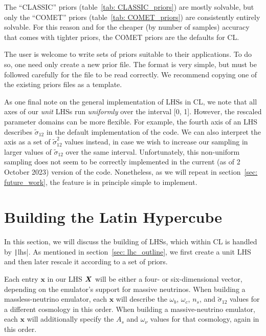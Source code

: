 The ``CLASSIC'' priors (table~\ref{tab: CLASSIC_priors}) are mostly solvable, 
but only the ``COMET'' priors (table~\ref{tab: COMET_priors}) are consistently
entirely solvable. For this reason and for the cheaper (by number of samples) 
accuracy that comes with tighter priors, the COMET priors are the defaults for 
CL.

The user is welcome to write sets of priors suitable to their applications.
To do so, one need only create a new prior file. The format is very simple, 
but must be followed carefully for the file to be read correctly. We
recommend copying one of the existing priors files as a template. 

As one final note on the general implementation of LHSs in CL, we note that
all axes of our \textit{unit} LHSs run \textit{uniformly} over the interval
[0, 1]. However, the rescaled 
parameter domains can be more flexible. For example, the fourth axis
of an LHS
describes $\tilde{\sigma}_{12}$ in the default implementation of the code. We can also
interpret the axis as a set of $\tilde{\sigma}_{12}^2$ values instead,
in case we wish to
increase our sampling in larger values of $\tilde{\sigma}_{12}$ over the same
interval. Unfortunately, this non-uniform sampling does not seem to be
correctly implemented
in the current (as of 2 October 2023) version of the code. Nonetheless, as we
will repeat in section~\ref{sec: future_work},
the feature is in principle simple to implement.


\section{Building the Latin Hypercube}
\label{sec: build_lhc}


In this section, we will discuss the building of LHSs, which within CL is 
handled by \texttt|lhs|. As mentioned in section~\ref{sec: lhc_outline},
we first create a unit LHS and then later rescale it according to a set of
priors.

Each entry $\bm{x}$ in our LHS $\bm{X}$ will be either a four- or
six-dimensional vector, 
depending on the emulator's support for massive neutrinos. When building a
massless-neutrino emulator, each $\bm{x}$ will describe the $\omega_b$,
$\omega_c$, $n_s$, and
$\tilde{\sigma}_{12}$ values for a different cosmology in 
this order. When building a massive-neutrino emulator, each $\bm{x}$ will 
additionally specify the $A_s$ and $\omega_\nu$ values for that cosmology, 
again in this order.


